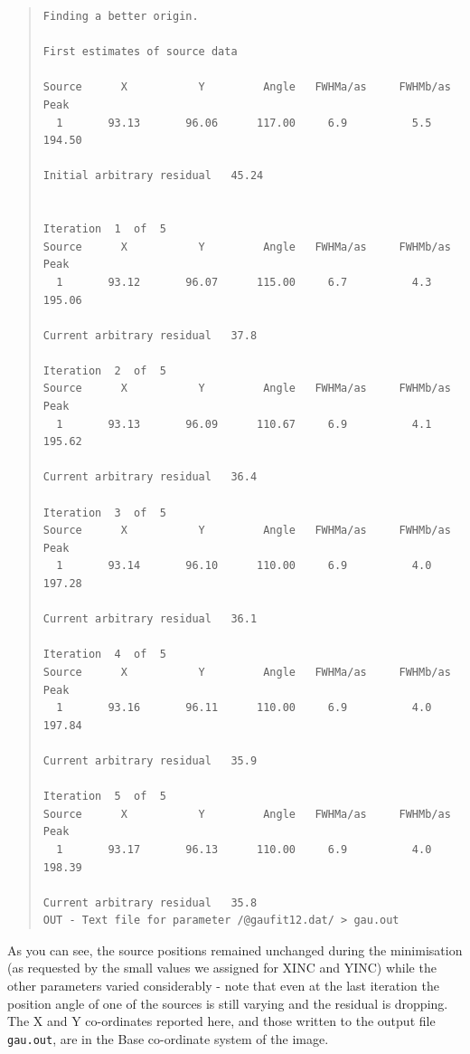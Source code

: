 \documentclass[twoside,11pt]{article}
\newenvironment{myquote}{\begin{quote}\begin{small}}{\end{small}\end{quote}}
\begin{document}
 
\begin{myquote}
\begin{verbatim}
Finding a better origin.
 
First estimates of source data

Source      X           Y         Angle   FWHMa/as     FWHMb/as         Peak
  1       93.13       96.06      117.00     6.9          5.5           194.50

Initial arbitrary residual   45.24


Iteration  1  of  5
Source      X           Y         Angle   FWHMa/as     FWHMb/as         Peak
  1       93.12       96.07      115.00     6.7          4.3           195.06

Current arbitrary residual   37.8

Iteration  2  of  5
Source      X           Y         Angle   FWHMa/as     FWHMb/as         Peak
  1       93.13       96.09      110.67     6.9          4.1           195.62

Current arbitrary residual   36.4

Iteration  3  of  5
Source      X           Y         Angle   FWHMa/as     FWHMb/as         Peak
  1       93.14       96.10      110.00     6.9          4.0           197.28

Current arbitrary residual   36.1

Iteration  4  of  5
Source      X           Y         Angle   FWHMa/as     FWHMb/as         Peak
  1       93.16       96.11      110.00     6.9          4.0           197.84

Current arbitrary residual   35.9

Iteration  5  of  5
Source      X           Y         Angle   FWHMa/as     FWHMb/as         Peak
  1       93.17       96.13      110.00     6.9          4.0           198.39

Current arbitrary residual   35.8
OUT - Text file for parameter /@gaufit12.dat/ > gau.out

\end{verbatim}
\end{myquote}

As you can see, the source positions remained unchanged during the minimisation
(as requested by the small values we assigned for XINC and YINC) while
the other parameters varied considerably -  note that even at the last 
iteration the position angle of one of the sources is still varying and the
residual is dropping. 
The X and Y co-ordinates reported here,
and those written to the output file {\tt gau.out}, 
are in the Base co-ordinate system of the image.
\end{document}
